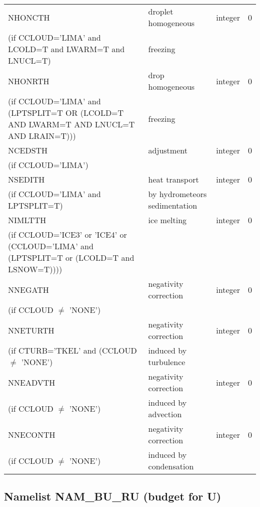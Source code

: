 \begin{longtable} {|p{}|p{}|>{\centering}p{}|p{}<{\centering}|}
NHONCTH   &  droplet homogeneous      & integer  &  0 \index{NHONCTH!\innam{NAM\_BU\_RTH}}\\ \nopagebreak
(if CCLOUD='LIMA' and LCOLD=T and LWARM=T and LNUCL=T)   &freezing   &       &   \\\hline
NHONRTH   & drop homogeneous       & integer  &  0 \index{NHONRTH!\innam{NAM\_BU\_RTH}}\\ \nopagebreak
(if CCLOUD='LIMA' and (LPTSPLIT=T OR (LCOLD=T AND LWARM=T AND LNUCL=T AND LRAIN=T)))   & freezing  &       &   \\\hline
NCEDSTH   & adjustment      & integer  &  0 \index{NCEDSTH!\innam{NAM\_BU\_RTH}}\\ \nopagebreak
(if CCLOUD='LIMA')   &   &       &   \\\hline
NSEDITH   &  heat transport & integer  &  0 \index{NSEDITH!\innam{NAM\_BU\_RTH}}\\ \nopagebreak
(if CCLOUD='LIMA' and LPTSPLIT=T)   &by hydrometeors sedimentation   &       &   \\\hline
NIMLTTH   & ice melting      & integer  &  0 \index{NIMLTTH!\innam{NAM\_BU\_RTH}}\\ \nopagebreak
(if CCLOUD='ICE3' or 'ICE4' or (CCLOUD='LIMA' and (LPTSPLIT=T or (LCOLD=T and LSNOW=T)))) & &   &  \\\hline
NNEGATH  & negativity correction & integer  &  0 \index{NNEGATH!\innam{NAM\_BU\_RTH}}\\\hline
(if CCLOUD $\neq$ 'NONE') & &   &  \\\hline
 NNETURTH  &  negativity correction      & integer  &  0 \index{NNETURTH!\innam{NAM\_BU\_RTH}}\\ \nopagebreak
(if CTURB='TKEL' and (CCLOUD $\neq$ 'NONE')   &induced by turbulence   &       &   \\\hline
 NNEADVTH  & negativity correction       & integer  &  0 \index{NNEADVTH!\innam{NAM\_BU\_RTH}}\\ \nopagebreak
(if CCLOUD $\neq$ 'NONE')   &induced by advection   &       &   \\\hline
 NNECONTH  & negativity correction       & integer  &  0 \index{NNECONTH!\innam{NAM\_BU\_RTH}}\\ \nopagebreak
(if CCLOUD $\neq$ 'NONE')   &induced by condensation   &       &   \\\hline
\end{longtable}

\subsection{Namelist NAM\_BU\_RU (budget for U)}

